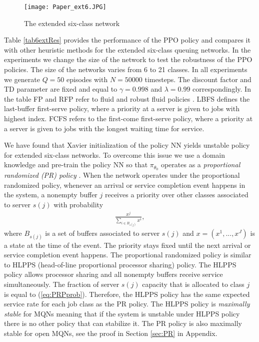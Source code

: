 \documentclass[11pt]{article}
\theoremstyle{definition}
\numberwithin{equation}{section}
\begin{document}
\begin{figure}[H]
\centering%
\texttt{[image: Paper\_ext6.JPG]}
\caption[]{The extended six-class network}
\label{fig1}%
\end{figure}

 Table \ref{tab6extRes} provides the performance of the PPO policy and compares it with other heuristic methods for the extended six-class queuing networks. In the experiments we change the size of the network to test the robustness of the PPO policies. The size of the networks varies from 6 to 21 classes. In all experiments we generate $Q=50$ episodes with $N=50000$ timesteps. The discount factor and TD parameter are fixed and equal to $\gamma=0.998$ and $\lambda = 0.99$ correspondingly.
In the table FP and RFP refer to fluid and robust fluid policies \cite{Bertsimas2015}.
LBFS defines the last-buffer first-serve policy, where a priority at a server is given to jobs with highest index.  FCFS refers to the first-come first-serve policy, where a priority at a server is given to jobs with the longest waiting time for service.


We have found that Xavier initialization of the policy NN yields unstable policy for   extended six-class networks. To overcome this issue we use a domain knowledge and pre-train the policy NN so that $\pi_{\theta_0}$  operates as a  \textit{proportional randomized (PR) policy} .
When the network operates under the proportional randomized policy, whenever an arrival or service completion event happens in the system,  a nonempty buffer $j$ receives a priority over other classes associated to server $s(j)$ with probability 
\begin{align}\label{eq:PRPprob}
\frac{x^j}{\sum\limits_{i\in B_{s(j)}}  x^i},
\end{align} where  $B_{s(j)}$ is a set of buffers associated to server $s(j)$ and $x = (x^1, ..., x^J)$ is a state at the time of the event.  The priority  stays fixed   until the next arrival or service completion event happens. The proportional randomized policy is similar to HLPPS (head-of-line proportional processor sharing) policy. The HLPPS policy allows processor sharing and all nonempty buffers receive  service
simultaneously. The fraction of server $s(j)$ capacity that is allocated to class $j$ is equal to (\ref{eq:PRPprob}). Therefore,  the HLPPS policy has the same expected service rate for each job class as the PR policy. 
The HLPPS policy is \textit{maximally stable} for MQNs \cite{Bramson1996} meaning that if the system is unstable under HLPPS policy there is no other policy that can stabilize it.  The PR policy is also maximally stable for open MQNs, see the proof in Section \ref{sec:PR} in Appendix.
 
\end{document}
